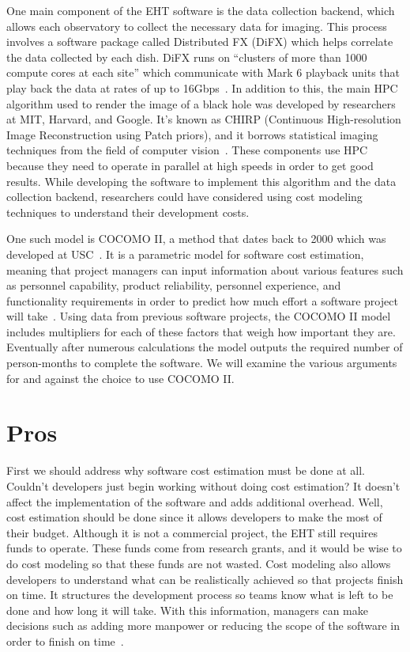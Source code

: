 \documentclass[letterpaper,twocolumn,10pt]{article}
\begin{document}
One main component of the EHT software is the data collection backend, which allows each observatory to collect the necessary data for imaging.
This process involves a software package called Distributed FX (DiFX) which helps correlate the data collected by each dish. DiFX runs on ``clusters
of more than 1000 compute cores at each site'' which communicate with Mark 6 playback units that play back the data at rates of up to 16Gbps~\cite{EHT}.
In addition to this, the main HPC algorithm used to render the image of a black hole was developed by researchers at MIT, Harvard, and Google.
It's known as CHIRP (Continuous High-resolution Image Reconstruction using Patch priors), and it borrows statistical imaging techniques from the
field of computer vision~\cite{Bouman}. These components use HPC because they need to operate in parallel at high speeds in order to get good results.
While developing the software to implement this algorithm and the data collection backend, researchers could have considered using cost modeling techniques
to understand their development costs.

One such model is COCOMO II, a method that dates back to 2000 which was developed at USC~\cite{COCOMO}. It is a parametric
model for software cost estimation, meaning that project managers can input information about various features such as personnel capability, product reliability,
personnel experience, and functionality requirements in order to predict how much effort a software project will take~\cite{COCOMO}. Using data
from previous software projects, the COCOMO II model includes multipliers for each of these factors that weigh how important they are. Eventually
after numerous calculations the model outputs the required number of person-months to complete the software. We will examine the
various arguments for and against the choice to use COCOMO II.

\section{Pros}

First we should address why software cost estimation must be done at all. Couldn't developers just begin working without doing cost
estimation? It doesn't affect the implementation of the software and adds additional overhead. Well, cost estimation should be done
since it allows developers to make the most of their budget. Although it is not a commercial project, the EHT still requires
funds to operate. These funds come from research grants, and it would be wise to do cost modeling so that these funds are not wasted. Cost
modeling also allows developers to understand what can be realistically achieved so that projects finish on time. It structures
the development process so teams know what is left to be done and how long it will take. With this information, managers can make
decisions such as adding more manpower or reducing the scope of the software in order to finish on time~\cite{McConnell}.
\end{document}

